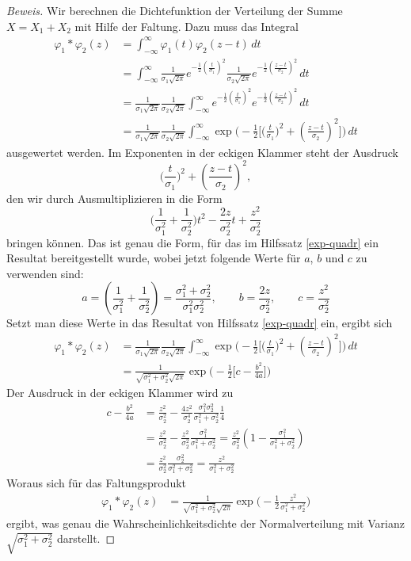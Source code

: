 \begin{proof}[Beweis]
Wir berechnen die Dichtefunktion der Verteilung der Summe $X=X_1+X_2$
mit Hilfe der Faltung. 
Dazu muss das Integral 
\begin{align*}
\varphi_1*\varphi_2(z)
&=
\int_{-\infty}^{\infty}\varphi_1(t)\varphi_2(z-t)\,dt\\
&=
\int_{-\infty}^{\infty}
\frac1{\sigma_1\sqrt{2\pi}}e^{-\frac12\left(\frac{t}{\sigma_1}\right)^2}
\frac1{\sigma_2\sqrt{2\pi}}e^{-\frac12\left(\frac{z-t}{\sigma_2}\right)^2}
\,dt\\
&=
\frac1{\sigma_1\sqrt{2\pi}}
\frac1{\sigma_2\sqrt{2\pi}}
\int_{-\infty}^{\infty}
e^{-\frac12\left(\frac{t}{\sigma_1}\right)^2}
e^{-\frac12\left(\frac{z-t}{\sigma_2}\right)^2}
\,dt\\
&=
\frac1{\sigma_1\sqrt{2\pi}}
\frac1{\sigma_2\sqrt{2\pi}}
\int_{-\infty}^{\infty}
\exp\biggl(-\frac12\biggl[\biggl(\frac{t}{\sigma_1}\biggr)^2
+\left(\frac{z-t}{\sigma_2}\right)^2\biggr]\biggr)
\,dt
\end{align*}
ausgewertet werden.
Im Exponenten in der eckigen Klammer steht der Ausdruck
\[
\biggl(\frac{t}{\sigma_1}\biggr)^2 +\left(\frac{z-t}{\sigma_2}\right)^2,
\]
den wir durch Ausmultiplizieren in die Form
\[
\biggl(\frac1{\sigma_1^2}+\frac1{\sigma_2^2}\biggr)t^2
-\frac{2z}{\sigma_2^2}t+\frac{z^2}{\sigma_2^2}
\]
bringen können.
Das ist genau die Form, für das im Hilfssatz \ref{exp-quadr}
ein Resultat bereitgestellt wurde, wobei jetzt folgende Werte für $a$, $b$ und $c$
zu verwenden sind:
\[
a=\left(\frac1{\sigma_1^2}+\frac1{\sigma_2^2}\right)
=\frac{\sigma_1^2+\sigma_2^2}{\sigma_1^2\sigma_2^2},\qquad
b=\frac{2z}{\sigma_2^2},\qquad
c=\frac{z^2}{\sigma_2^2}
\]
Setzt man diese Werte in das Resultat von Hilfssatz \ref{exp-quadr} ein,
ergibt sich
\begin{align*}
\varphi_1*\varphi_2(z)
&=
\frac1{\sigma_1\sqrt{2\pi}}
\frac1{\sigma_2\sqrt{2\pi}}
\int_{-\infty}^{\infty}
\exp\biggl(-\frac12\biggl[\biggl(\frac{t}{\sigma_1}\biggr)^2
+\left(\frac{z-t}{\sigma_2}\right)^2\biggr]\biggr)
\,dt\\
&=
\frac1{\sqrt{\sigma_1^2+\sigma_2^2}\sqrt{2\pi}}
\exp\biggl(-\frac12\biggl[c-\frac{b^2}{4a} \biggr]\biggr)
\end{align*}
Der Ausdruck in der eckigen Klammer wird zu
\begin{align*}
c-\frac{b^2}{4a}
&=
\frac{z^2}{\sigma_2^2}
-
\frac{4z^2}{\sigma_2^4}
\frac{\sigma_1^2\sigma_2^2}{\sigma_1^2+\sigma_2^2}
\frac14\\
&=
\frac{z^2}{\sigma_2^2}
-
\frac{z^2}{\sigma_2^2}
\frac{\sigma_1^2}{\sigma_1^2+\sigma_2^2}
=
\frac{z^2}{\sigma_2^2}
\left(
1-\frac{\sigma_1^2}{\sigma_1^2+\sigma_2^2}
\right)\\
&=
\frac{z^2}{\sigma_2^2}
\frac{\sigma_2^2}{\sigma_1^2+\sigma_2^2}
=
\frac{z^2}
{\sigma_1^2+\sigma_2^2}
\end{align*}
Woraus sich für das Faltungsprodukt
\begin{align*}
\varphi_1*\varphi_2(z)
&=
\frac1{\sqrt{\sigma_1^2+\sigma_2^2}\sqrt{2\pi}}
\exp\biggl(-\frac12\frac{z^2}{\sigma_1^2+\sigma_2^2}\biggr)
\end{align*}
ergibt, was genau die Wahrscheinlichkeitsdichte der Normalverteilung
mit Varianz $\sqrt{\sigma_1^2+\sigma_2^2}$ darstellt.
\end{proof}

